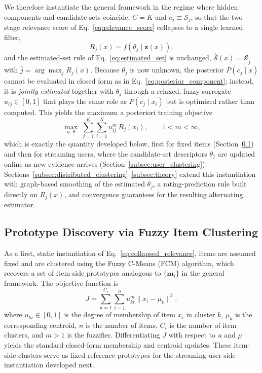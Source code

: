 \documentclass{article}
\begin{document}
We therefore instantiate the general framework in the regime where hidden components and candidate sets coincide, $C = K$ and $c_j \equiv \mathcal{S}_j$, so that the two-stage relevance score of Eq.~\eqref{eq:relevance_score} collapses to a single learned filter,
\begin{equation}
	\label{eq:collapsed_relevance}
	R_j(x) = f(\theta_j \mid \mathbf{z}(x)),
\end{equation}
and the estimated-set rule of Eq.~\eqref{eq:estimated_set} is unchanged, $\widehat{\mathcal{S}}(x) = \mathcal{S}_{\widehat{j}}$ with $\widehat{j} = \arg\max_j R_j(x)$. Because $\theta_j$ is now unknown, the posterior $P(c_j \mid x)$ cannot be evaluated in closed form as in Eq.~\eqref{eq:posterior_component}; instead, it is \emph{jointly estimated} together with $\theta_j$ through a relaxed, fuzzy surrogate $u_{ij} \in [0,1]$ that plays the same role as $P(c_j\mid x_i)$ but is optimized rather than computed. This yields the maximum a posteriori training objective
\[
\max_{u,\,\theta} \; \sum_{j=1}^{K} \sum_{i=1}^{N} u_{ij}^{m} \, R_j(x_i), \qquad 1 < m < \infty,
\]
which is exactly the quantity developed below, first for fixed items (Section~\ref{subsec:item_clustering}) and then for streaming users, where the candidate-set descriptors $\theta_j$ are updated online as new evidence arrives (Section~\ref{subsec:user_clustering}). Sections~\ref{subsec:distributed_clustering}--\ref{subsec:theory} extend this instantiation with graph-based smoothing of the estimated $\theta_j$, a rating-prediction rule built directly on $R_j(x)$, and convergence guarantees for the resulting alternating estimator.

\subsection{Prototype Discovery via Fuzzy Item Clustering}
\label{subsec:item_clustering}

As a first, static instantiation of Eq.~\eqref{eq:collapsed_relevance}, items are assumed fixed and are clustered using the Fuzzy C-Means (FCM) algorithm, which recovers a set of item-side prototypes analogous to $\{\mathbf{m}_i\}$ in the general framework. The objective function is
\begin{equation}
	J = \sum_{k=1}^{C_i} \sum_{i=1}^{n} u_{ki}^m \| x_i - \mu_k \|^2,
\end{equation}
where $u_{ki} \in [0,1]$ is the degree of membership of item $x_i$ in cluster $k$, $\mu_k$ is the corresponding centroid, $n$ is the number of items, $C_i$ is the number of item clusters, and $m > 1$ is the fuzzifier. Differentiating $J$ with respect to $u$ and $\mu$ yields the standard closed-form membership and centroid updates. These item-side clusters serve as fixed reference prototypes for the streaming user-side instantiation developed next.
\end{document}
